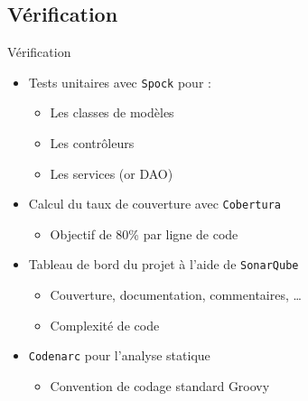 \subsection{Vérification}
\begin{frame}{Vérification}
	\begin{itemize}
		\item Tests unitaires avec \texttt{Spock} pour : 
		\begin{itemize}
			\item Les classes de modèles
			\item Les contrôleurs
			\item Les services (or DAO)
		\end{itemize}
		\vfill
		\item Calcul du taux de couverture avec \texttt{Cobertura} 
		\begin{itemize}
			\item Objectif de 80\% par ligne de code
		\end{itemize}
				\vfill
		\item Tableau de bord du projet à l'aide de \texttt{SonarQube}
		\begin{itemize}
			\item Couverture, documentation, commentaires, \ldots 
			\item Complexité de code
		\end{itemize}
				\vfill
		\item \texttt{Codenarc} pour l'analyse statique 
		\begin{itemize}
			\item Convention de codage standard Groovy
		\end{itemize}
	\end{itemize}
\end{frame}

\SteveSpeak
